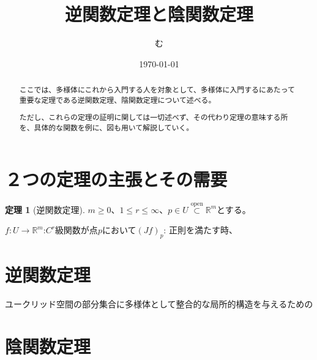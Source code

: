 \documentclass{jsarticle}
\theoremstyle{definition}
\newtheorem{theorem}{定理}
\begin{document}
\title{逆関数定理と陰関数定理}
\author{む}
\date{\today}
\maketitle
\begin{abstract}
ここでは、多様体にこれから入門する人を対象として、多様体に入門するにあたって重要な定理である逆関数定理、陰関数定理について述べる。

ただし、これらの定理の証明に関しては一切述べず、その代わり定理の意味する所を、具体的な関数を例に、図も用いて解説していく。
\end{abstract}

\tableofcontents

\section{２つの定理の主張とその需要}

\begin{theorem}[逆関数定理]
$m\ge 0$、$1\le r\le \infty$、$p\in U\overset{\text{open}}{\subset} \mathbb{R}^m$とする。

$f : U\rightarrow \mathbb{R}^m$:$C^r$級関数が点$p$において$(Jf)_p$: 正則を満たす時、
\end{theorem}

\section{逆関数定理}
ユークリッド空間の部分集合に多様体として整合的な局所的構造を与えるための
\section{陰関数定理}
\end{document}
